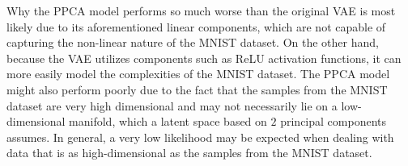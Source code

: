 Why the PPCA model performs so much worse than the original VAE is most likely due to its aforementioned linear components, which are not capable of capturing the non-linear nature of the MNIST dataset. On the other hand, because the VAE utilizes components such as ReLU activation functions, it can more easily model the complexities of the MNIST dataset. The PPCA model might also perform poorly due to the fact that the samples from the MNIST dataset are very high dimensional and may not necessarily lie on a low-dimensional manifold, which a latent space based on $2$ principal components assumes. In general, a very low likelihood may be expected when dealing with data that is as high-dimensional as the samples from the MNIST dataset. 